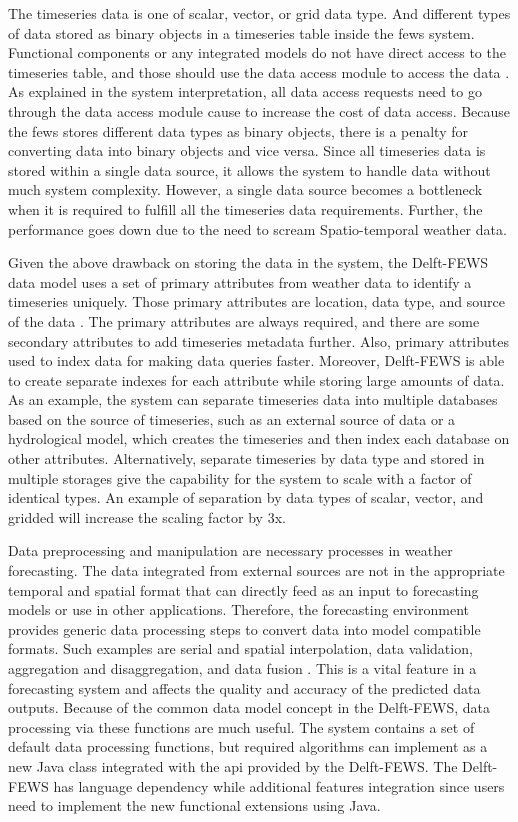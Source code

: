 The timeseries data is one of scalar, vector, or grid data type. And different types of data stored as binary objects in a timeseries table inside the \acrshort{fews} system. Functional components or any integrated models do not have direct access to the timeseries table, and those should use the data access module to access the data \cite{Werner2013TheSystem}. As explained in the system interpretation, all data access requests need to go through the data access module cause to increase the cost of data access. Because the \acrshort{fews} stores different data types as binary objects, there is a penalty for converting data into binary objects and vice versa. Since all timeseries data is stored within a single data source, it allows the system to handle data without much system complexity. However, a single data source becomes a bottleneck when it is required to fulfill all the timeseries data requirements. Further, the performance goes down due to the need to scream Spatio-temporal weather data.

Given the above drawback on storing the data in the system, the Delft-FEWS data model uses a set of primary attributes from weather data to identify a timeseries uniquely. Those primary attributes are location, data type, and source of the data \cite{Werner2013TheSystem}. The primary attributes are always required, and there are some secondary attributes to add timeseries metadata further. Also, primary attributes used to index data for making data queries faster. Moreover, Delft-FEWS is able to create separate indexes for each attribute while storing large amounts of data. As an example, the system can separate timeseries data into multiple databases based on the source of timeseries, such as an external source of data or a hydrological model, which creates the timeseries and then index each database on other attributes. Alternatively, separate timeseries by data type and stored in multiple storages give the capability for the system to scale with a factor of identical types. An example of separation by data types of scalar, vector, and gridded will increase the scaling factor by 3x.

Data preprocessing and manipulation are necessary processes in weather forecasting. The data integrated from external sources are not in the appropriate temporal and spatial format that can directly feed as an input to forecasting models or use in other applications. Therefore, the forecasting environment provides generic data processing steps to convert data into model compatible formats. Such examples are serial and spatial interpolation, data validation, aggregation and disaggregation, and data fusion \cite{Werner2013TheSystem}. This is a vital feature in a forecasting system and affects the quality and accuracy of the predicted data outputs. Because of the common data model concept in the Delft-FEWS, data processing via these functions are much useful. The system contains a set of default data processing functions, but required algorithms can implement as a new Java class integrated with the \acrfull{api} provided by the Delft-FEWS. The Delft-FEWS has language dependency while additional features integration since users need to implement the new functional extensions using Java. 

